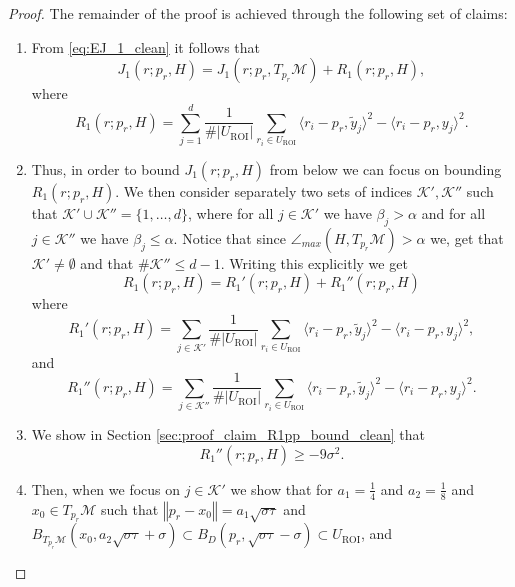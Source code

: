 \documentclass[12pt]{article}
\theoremstyle{remark}
\newcommand{\MM}{\mathcal{M}}
\newcommand{\KK}{\mathcal{K}}
\newcommand{\norm}[1]{\left\Vert #1 \right\Vert}
\begin{document}
\begin{appendices}
\begin{proof}
The remainder of the proof is achieved through the following set of claims:
\begin{enumerate}
    \item\label{thm:claim_J1H_clean} From \eqref{eq:EJ_1_clean} it follows that
    \[J_1(r; {p_r}, H) =  J_1(r;{p_r},T_{p_r}\MM) +  R_1(r;{p_r},H),\]
    where
    \begin{equation}\label{eq:sum_k_clean}
    R_1(r; {p_r}, H) = \sum\limits_{j=1}^{d} \frac{1}{\#|U_\textrm{ROI}|}\sum\limits_{r_i\in U_\textrm{ROI}}  \langle r_i - {p_r}, \tilde{y}_j \rangle^2 - \langle r_i - {p_r}, {y}_j \rangle^2
    .\end{equation}
    \item Thus, in order to bound $J_1(r; {p_r}, H)$ from below we can focus on bounding $R_1(r; {p_r}, H)$.
    We then consider separately two sets of indices $\KK', \KK''$ such that $\KK' \cup \KK'' = \{1,\ldots, d\}$, where for all $j\in \KK'$ we have $\beta_j > \alpha$ and for all $j\in \KK''$ we have $\beta_j\leq \alpha$.
    Notice that since $\angle_{max}(H, T_{p_r}\MM) > \alpha$ we, get that $\KK' \not = \emptyset$ and that $\#\KK'' \leq d-1$.
    Writing this explicitly we get
    \begin{equation}\label{eq:RpRpp_clean}
        R_1(r; {p_r}, H) = R_1'(r; {p_r}, H)  +  R_1''(r; {p_r}, H)
    \end{equation}
    where 
    \begin{equation}\label{eq:R1p_def_clean}
    R_1'(r; {p_r}, H) = \sum\limits_{j\in\KK'} \frac{1}{\#|U_\textrm{ROI}|}\sum\limits_{r_i\in U_\textrm{ROI}}  \langle r_i - {p_r}, \tilde{y}_j \rangle^2 - \langle r_i - {p_r}, {y}_j \rangle^2
    ,\end{equation}
    and
    \begin{equation}\label{eq:R1pp_def_clean}
    R_1''(r; {p_r}, H) = \sum\limits_{j\in\KK''} \frac{1}{\#|U_\textrm{ROI}|}\sum\limits_{r_i\in U_\textrm{ROI}}  \langle r_i - {p_r}, \tilde{y}_j \rangle^2 - \langle r_i - {p_r}, {y}_j \rangle^2
    .\end{equation}
    \item\label{thm:claim_R1pp_bound_clean} We show in Section \ref{sec:proof_claim_R1pp_bound_clean} that
    \begin{equation}\label{eq:R1pp_bound_clean}
    R_1''(r; {p_r}, H) \geq
    -9 \sigma^2
    .\end{equation}
    \item\label{thm:claim_ri_tyk_bound_clean} Then, when we focus on $j\in\KK'$ we show that for $a_1 = \frac{1}{4}$ and $a_2 = \frac{1}{8}$ and $x_0\in T_{p_r}\MM$ such that $\norm{{p_r} - x_0} = a_1\sqrt{\sigma\tau}$ and $B_{T_{p_r}\MM}(x_0, a_2 \sqrt{\sigma\tau} + \sigma)\subset B_D({p_r}, \sqrt{\sigma \tau} - \sigma) \subset U_\textrm{ROI}$, and 

\end{enumerate}
\end{proof}
\end{appendices}
\end{document}

